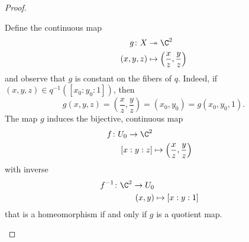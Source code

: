 \documentclass[10pt]{amsart}
\begin{document}
\begin{thm}
\begin{proof}
\begin{enumerate}[(a)]
      Define the continuous map
      \begin{align*}
        g \colon X &\twoheadrightarrow \C^2\\
        (x,y,z) &\mapsto \left(\frac{x}{z},\frac{y}{z}\right)
      \end{align*}
      and observe that $g$ is constant on the fibers of $q$.
      Indeed, if $(x,y,z) \in q^{-1}\left([x_0:y_0:1]\right)$, then
      $$g(x,y,z) = \left(\frac{x}{z}, \frac{y}{z}\right) = (x_0, y_0) = g(x_0, y_0, 1).$$
      The map $g$ induces the bijective, continuous map
      \begin{align*}
        f \colon U_0 \rightarrow \C^2\\
        [x : y : z] &\mapsto \left(\frac{x}{z}, \frac{y}{z}\right)
      \end{align*}
      with inverse
      \begin{align*}
        f^{-1} \colon \C^2 \rightarrow U_0\\
        (x,y) &\mapsto [x : y : 1]
      \end{align*}
      that is a homeomorphism if and only if $g$ is a quotient map.
      

\end{enumerate}
\end{proof}
\end{thm}
\end{document}
